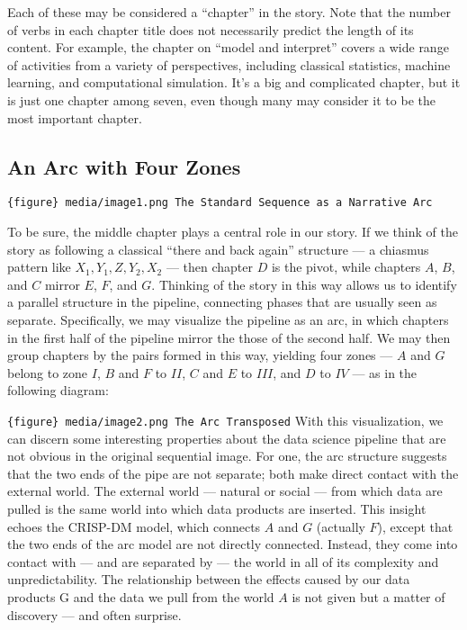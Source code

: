\documentclass[
  letterpaper,
  DIV=11,
  numbers=noendperiod]{scrreprt}
\begin{document}
Each of these may be considered a ``chapter'' in the story. Note that
the number of verbs in each chapter title does not necessarily predict
the length of its content. For example, the chapter on ``model and
interpret'' covers a wide range of activities from a variety of
perspectives, including classical statistics, machine learning, and
computational simulation. It's a big and complicated chapter, but it is
just one chapter among seven, even though many may consider it to be the
most important chapter.

\hypertarget{an-arc-with-four-zones}{%
\subsection{An Arc with Four Zones}\label{an-arc-with-four-zones}}

\texttt{\{figure\}\ media/image1.png\ The\ Standard\ Sequence\ as\ a\ Narrative\ Arc}

To be sure, the middle chapter plays a central role in our story. If we
think of the story as following a classical ``there and back again''
structure --- a chiasmus pattern like \(X_1, Y_1, Z, Y_2, X_2\) --- then
chapter \(D\) is the pivot, while chapters \(A\), \(B\), and \(C\)
mirror \(E\), \(F\), and \(G\). Thinking of the story in this way allows
us to identify a parallel structure in the pipeline, connecting phases
that are usually seen as separate. Specifically, we may visualize the
pipeline as an arc, in which chapters in the first half of the pipeline
mirror the those of the second half. We may then group chapters by the
pairs formed in this way, yielding four zones --- \(A\) and \(G\) belong
to zone \(I\), \(B\) and \(F\) to \(II\), \(C\) and \(E\) to \(III\),
and \(D\) to \(IV\) --- as in the following diagram:

\texttt{\{figure\}\ media/image2.png\ The\ Arc\ Transposed} With this
visualization, we can discern some interesting properties about the data
science pipeline that are not obvious in the original sequential image.
For one, the arc structure suggests that the two ends of the pipe are
not separate; both make direct contact with the external world. The
external world --- natural or social --- from which data are pulled is
the same world into which data products are inserted. This insight
echoes the CRISP-DM model, which connects \(A\) and \(G\) (actually
\(F\)), except that the two ends of the arc model are not directly
connected. Instead, they come into contact with --- and are separated by
--- the world in all of its complexity and unpredictability. The
relationship between the effects caused by our data products G and the
data we pull from the world \(A\) is not given but a matter of discovery
--- and often surprise.
\end{document}
